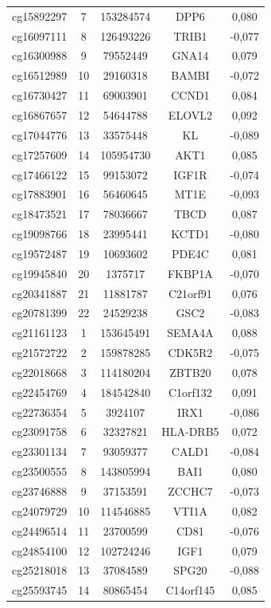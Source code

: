 \documentclass[12pt,a4paper]{article}
\begin{document}
\begin{longtable}{|c|c|c|c|c|}
		cg15892297 & 7 & 153284574 & DPP6 & 0,080 \\
		cg16097111 & 8 & 126493226 & TRIB1 & -0,077 \\
		cg16300988 & 9 & 79552449 & GNA14 & 0,079 \\
		cg16512989 & 10 & 29160318 & BAMBI & -0,072 \\
		cg16730427 & 11 & 69003901 & CCND1 & 0,084 \\
		cg16867657 & 12 & 54644788 & ELOVL2 & 0,092 \\
		cg17044776 & 13 & 33575448 & KL & -0,089 \\
		cg17257609 & 14 & 105954730 & AKT1 & 0,085 \\
		cg17466122 & 15 & 99153072 & IGF1R & -0,074 \\
		cg17883901 & 16 & 56460645 & MT1E & -0,093 \\
		cg18473521 & 17 & 78036667 & TBCD & 0,087 \\
		cg19098766 & 18 & 23995441 & KCTD1 & -0,080 \\
		cg19572487 & 19 & 10693602 & PDE4C & 0,081 \\
		cg19945840 & 20 & 1375717 & FKBP1A & -0,070 \\
		cg20341887 & 21 & 11881787 & C21orf91 & 0,076 \\
		cg20781399 & 22 & 24529238 & GSC2 & -0,083 \\
		cg21161123 & 1 & 153645491 & SEMA4A & 0,088 \\
		cg21572722 & 2 & 159878285 & CDK5R2 & -0,075 \\
		cg22018668 & 3 & 114180204 & ZBTB20 & 0,078 \\
		cg22454769 & 4 & 184542840 & C1orf132 & 0,091 \\
		cg22736354 & 5 & 3924107 & IRX1 & -0,086 \\
		cg23091758 & 6 & 32327821 & HLA-DRB5 & 0,072 \\
		cg23301134 & 7 & 93059377 & CALD1 & -0,084 \\
		cg23500555 & 8 & 143805994 & BAI1 & 0,080 \\
		cg23746888 & 9 & 37153591 & ZCCHC7 & -0,073 \\
		cg24079729 & 10 & 114546885 & VTI1A & 0,082 \\
		cg24496514 & 11 & 23700599 & CD81 & -0,076 \\
		cg24854100 & 12 & 102724246 & IGF1 & 0,079 \\
		cg25218018 & 13 & 37084589 & SPG20 & -0,088 \\
		cg25593745 & 14 & 80865454 & C14orf145 & 0,085 \\

\end{longtable}
\end{document}
